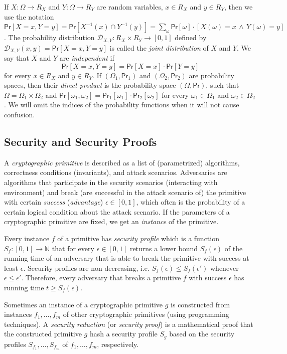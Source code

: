 \documentclass{article}
\newcommand{\prob}[0]{\mathsf{Pr}} %
\begin{document}
If $X\colon \Omega\rightarrow R_X$ and $Y\colon \Omega\rightarrow R_Y$ are
random variables, $x\in R_X$ and $y\in R_Y$, then we use the notation
$\prob[X=x, Y=y] = \prob[X^{-1}(x)\cap Y^{-1}(y)]=\sum_\omega \prob[\omega]\cdot[X(\omega)=x\,\wedge\, Y(\omega)=y]$.
The probability distribution $\mathcal{D}_{X,Y}\colon R_X \times R_Y\rightarrow [0,1]$ defined by $\mathcal{D}_{X,Y}(x,y)= \prob[X=x, Y=y]$ is called the \emph{joint distribution} of $X$ and $Y$.
We say that $X$ and $Y$ are \emph{independent} if
\[
\prob[X=x,Y=y]=\prob[X=x]\cdot\prob[Y=y]
\]
for every $x\in R_X$ and $y\in R_Y$.
If $(\Omega_1,\prob_1)$ and $(\Omega_2,\prob_2)$ are probability spaces, then their \emph{direct product} is the probability space $(\Omega, \prob)$, such that $\Omega = \Omega_1 \times \Omega_2$ and $\prob[\omega_1,\omega_2]=\prob_1[\omega_1]\cdot \prob_2[\omega_2]$ for every $\omega_1\in\Omega_1$ and $\omega_2\in\Omega_2$. We will omit the indices of the probability functions when it will not cause confusion.

\subsection{Security and Security Proofs}

A \emph{cryptographic primitive} is described as a list of (parametrized) algorithms, correctness conditions (invariants), and attack scenarios. Adversaries are algorithms that participate in the security scenarios (interacting with environment) and break (are successful in the attack scenario of) the primitive with certain \emph{success} (\emph{advantage}) $\epsilon\in[0,1]$, which often is the probability of a certain logical condition about the attack scenario.
If the parameters of a cryptographic primitive are fixed, we get an \emph{instance} of the primitive.

Every instance $f$ of a primitive has \emph{security profile}
which is a function $S_f\colon [0,1]\rightarrow \mathbb{N}$ that for every $\epsilon\in [0,1]$ returns a lower bound $S_f(\epsilon)$ of the running time of an adversary that is able to break the primitive with success at least $\epsilon$. Security profiles are non-decreasing, i.e.
$S_f(\epsilon)\le S_f(\epsilon')$ whenever $\epsilon\le \epsilon'$.
Therefore, every adversary that breaks a primitive $f$ with success $\epsilon$ has running time $t\ge S_f(\epsilon)$.

Sometimes an instance of a cryptographic primitive $g$ is constructed from instances $f_1, \ldots, f_m$ of other cryptographic primitives (using programming techniques).
A \emph{security reduction} (or \emph{security proof}) is a mathematical proof that the constructed primitive $g$ hash a security profile $S_g$
based on the security profiles $S_{f_1}, \ldots, S_{f_m}$ of $f_1, \ldots, f_m$, respectively.
\end{document}
